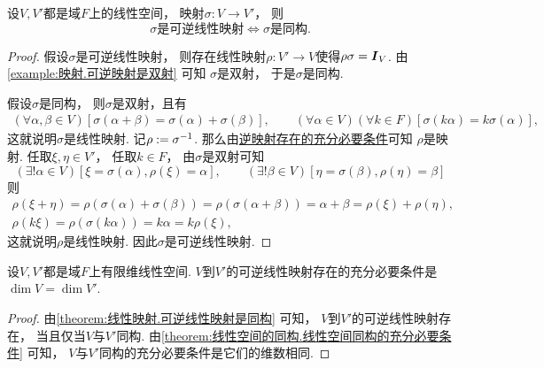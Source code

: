 \begin{proposition}\label{theorem:线性映射.可逆线性映射是同构}
设\(V,V'\)都是域\(F\)上的线性空间，
映射\(\sigma\colon V \to V'\)，
则\[
	\text{$\sigma$是可逆线性映射}
	\iff
	\text{$\sigma$是同构}.
\]
\begin{proof}
假设\(\sigma\)是可逆线性映射，
则存在线性映射\(\rho\colon V' \to V\)使得\(\rho\sigma = \boldsymbol{I}_V\).
由\cref{example:映射.可逆映射是双射} 可知
\(\sigma\)是双射，
于是\(\sigma\)是同构.

假设\(\sigma\)是同构，
则\(\sigma\)是双射，且有\begin{gather*}
	(\forall\alpha,\beta \in V)
	[\sigma(\alpha+\beta)=\sigma(\alpha)+\sigma(\beta)],
	\qquad
	(\forall\alpha \in V)
	(\forall k \in F)
	[\sigma(k\alpha)=k\sigma(\alpha)],
\end{gather*}
这就说明\(\sigma\)是线性映射.
记\(\rho := \sigma^{-1}\).
那么由\hyperref[theorem:集合论.关系及其逆是映射的充分必要条件]{逆映射存在的充分必要条件}可知
\(\rho\)是映射.
任取\(\xi,\eta \in V'\)，
任取\(k \in F\)，
由\(\sigma\)是双射可知\begin{equation*}
	(\exists!\alpha \in V)[\xi=\sigma(\alpha),\rho(\xi)=\alpha],
	\qquad
	(\exists!\beta \in V)[\eta=\sigma(\beta),\rho(\eta)=\beta]
\end{equation*}
则\begin{gather*}
	\rho(\xi+\eta)
	= \rho(\sigma(\alpha)+\sigma(\beta))
	= \rho(\sigma(\alpha+\beta))
	= \alpha+\beta
	= \rho(\xi)+\rho(\eta), \\
	\rho(k\xi)
	= \rho(\sigma(k\alpha))
	= k\alpha
	= k\rho(\xi),
\end{gather*}
这就说明\(\rho\)是线性映射.
因此\(\sigma\)是可逆线性映射.
\end{proof}
\end{proposition}

\begin{proposition}
设\(V,V'\)都是域\(F\)上有限维线性空间.
\(V\)到\(V'\)的可逆线性映射存在的充分必要条件是
\(\dim V=\dim V'\).
\begin{proof}
由\cref{theorem:线性映射.可逆线性映射是同构} 可知，
\(V\)到\(V'\)的可逆线性映射存在，
当且仅当\(V\)与\(V'\)同构.
由\cref{theorem:线性空间的同构.线性空间同构的充分必要条件} 可知，
\(V\)与\(V'\)同构的充分必要条件是它们的维数相同.
\end{proof}
\end{proposition}

